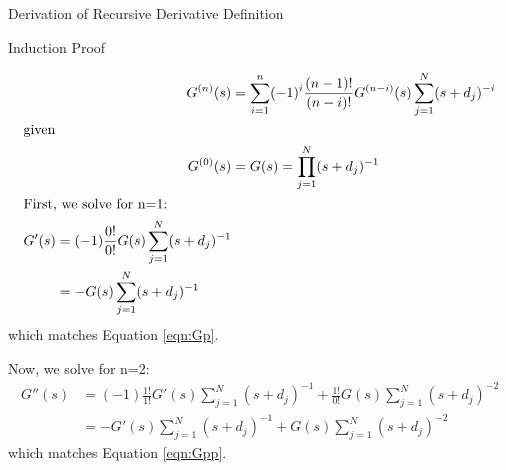 \begin{chapter}{Derivation of Recursive Derivative Definition\label{app:math.deriveG}}
  \begin{section}{Induction Proof}

    \begin{align}
      G^{(n)}(s) &= \sum_{i=1}^n (-1)^i \frac{(n-1)!}{(n-i)!} G^{(n-i)}(s)
                    \sum_{j=1}^{N} (s+d_j)^{-i}\\
      \intertext{given}
      G^{(0)}(s) &= G(s) = \prod_{j=1}^N (s+d_j)^{-1}\\
      \intertext{First, we solve for n=1:}
      \begin{split}
        G'(s) & =  (-1) \frac{0!}{0!} G(s) \sum_{j=1}^N (s+d_j)^{-1}\\
             & =  -G(s)  \sum_{j=1}^N (s+d_j)^{-1}
      \end{split}
    \end{align}
    \noindent which matches Equation \ref{eqn:Gp}.

    \vspace{1cm}

    \noindent Now, we solve for n=2:
    \begin{equation}
      \begin{split}
        G''(s) & =  (-1)\frac{1!}{1!}G'(s)\sum_{j=1}^N (s+d_j)^{-1} +
                    \frac{1!}{0!}G(s)\sum_{j=1}^N (s+d_j)^{-2}\\
               & =  -G'(s)\sum_{j=1}^N (s+d_j)^{-1} + G(s)\sum_{j=1}^N (s+d_j)^{-2}
      \end{split}
    \end{equation}
    \noindent which matches Equation \ref{eqn:Gpp}.

    \vspace{1cm}


\end{section}
\end{chapter}
